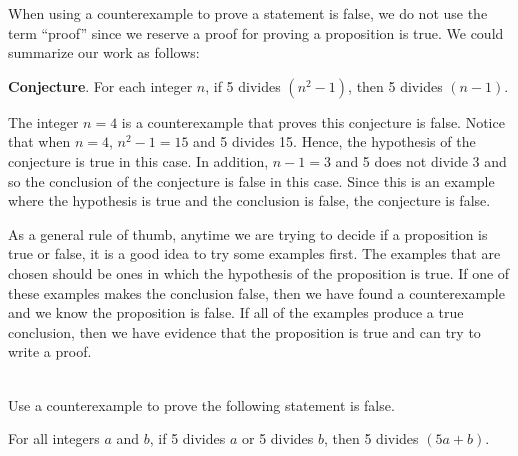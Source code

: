 When using a counterexample to prove a statement is false, we do not use the term ``proof'' since we reserve a proof for proving a proposition is true.  We could summarize our work as follows:


\indent
\parbox{4.5in}{\textbf{Conjecture}.  For each integer $n$, if 5 divides $\left(n^2 - 1 \right)$, then 5 divides $\left( n - 1 \right)$.}

\vskip6pt
\indent
\parbox{4.5in}{The integer $n = 4$ is a counterexample that proves this conjecture is false.  Notice that when $n = 4$, $n^2 - 1 = 15$ and 5 divides 15.  Hence, the hypothesis of the conjecture is true in this case.  In addition, $n - 1 = 3$ and 5 does not divide 3 and so the conclusion of the conjecture is false in this case.  Since this is an example where the hypothesis is true and the conclusion is false, the conjecture is false.}

\newpar
As a general rule of thumb, anytime we are trying to decide if a proposition is true or false, it is a good idea to try some examples first.  The examples that are chosen should be ones in which the hypothesis of the proposition is true.  If one of these examples makes the conclusion false, then we have found a counterexample and we know the proposition is false.  If all of the examples produce a true conclusion, then we have evidence that the proposition is true and can try to write a proof.
\hbreak

\begin{prog} \label{pr:counterexample} \hfill \\
Use a counterexample to prove the following statement is false.
\begin{list}{}
\item For all integers $a$ and $b$, if 5 divides $a$ or 5 divides $b$, then 5 divides $(5a + b)$. 
\end{list}
\end{prog}
%
\hbreak



